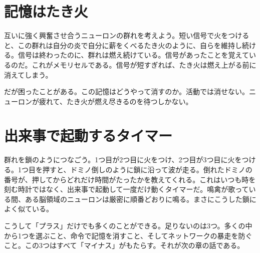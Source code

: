 \section*{記憶はたき火}

互いに強く興奮させ合うニューロンの群れを考えよう。短い信号で火をつけると、この群れは自分の炎で自分に薪をくべるたき火のように、自らを維持し続ける。信号は終わったのに、群れは燃え続けている。信号があったことを覚えているのだ。これがメモリセルである。信号が短すぎれば、たき火は燃え上がる前に消えてしまう。

だが困ったことがある。この記憶はどうやって消すのか。活動では消せない。ニューロンが疲れて、たき火が燃え尽きるのを待つしかない。

\section*{出来事で起動するタイマー}

群れを鎖のようにつなごう。1つ目が2つ目に火をつけ、2つ目が3つ目に火をつける。1つ目を押すと、ドミノ倒しのように鎖に沿って波が走る。倒れたドミノの番号が、押してからどれだけ時間がたったかを教えてくれる。これはいつも時を刻む時計ではなく、出来事で起動して一度だけ動くタイマーだ。鳴禽が歌っている間、ある脳領域のニューロンは厳密に順番どおりに鳴る。まさにこうした鎖によく似ている。

こうして「プラス」だけでも多くのことができる。足りないのは3つ。多くの中から1つを選ぶこと、命令で記憶を消すこと、そしてネットワークの暴走を防ぐこと。この3つはすべて「マイナス」がもたらす。それが次の章の話である。

